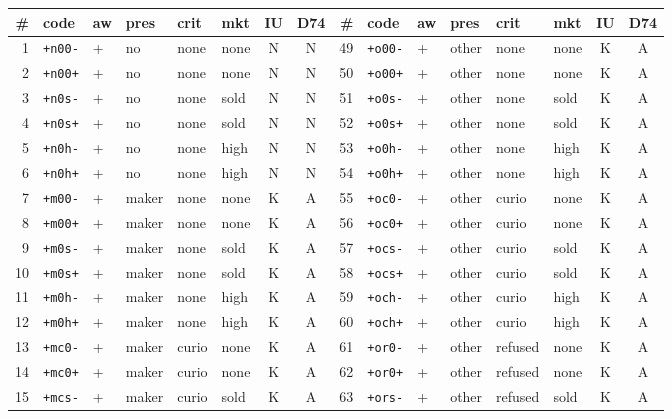 {\scriptsize\setlength{\tabcolsep}{3.5pt}
\begin{longtable}{@{}rlllllcc@{\hspace{2.2em}}rlllllcc@{}}
\# & code & aw & pres & crit & mkt & IU & D74 & \# & code & aw & pres & crit & mkt & IU & D74 \\ \midrule\endhead
1 & \texttt{+n00-} & + & no & none & none & N & N & 49 & \texttt{+o00-} & + & other & none & none & K & A \\
2 & \texttt{+n00+} & + & no & none & none & N & N & 50 & \texttt{+o00+} & + & other & none & none & K & A \\
3 & \texttt{+n0s-} & + & no & none & sold & N & N & 51 & \texttt{+o0s-} & + & other & none & sold & K & A \\
4 & \texttt{+n0s+} & + & no & none & sold & N & N & 52 & \texttt{+o0s+} & + & other & none & sold & K & A \\
5 & \texttt{+n0h-} & + & no & none & high & N & N & 53 & \texttt{+o0h-} & + & other & none & high & K & A \\
6 & \texttt{+n0h+} & + & no & none & high & N & N & 54 & \texttt{+o0h+} & + & other & none & high & K & A \\
7 & \texttt{+m00-} & + & maker & none & none & K & A & 55 & \texttt{+oc0-} & + & other & curio & none & K & A \\
8 & \texttt{+m00+} & + & maker & none & none & K & A & 56 & \texttt{+oc0+} & + & other & curio & none & K & A \\
9 & \texttt{+m0s-} & + & maker & none & sold & K & A & 57 & \texttt{+ocs-} & + & other & curio & sold & K & A \\
10 & \texttt{+m0s+} & + & maker & none & sold & K & A & 58 & \texttt{+ocs+} & + & other & curio & sold & K & A \\
11 & \texttt{+m0h-} & + & maker & none & high & K & A & 59 & \texttt{+och-} & + & other & curio & high & K & A \\
12 & \texttt{+m0h+} & + & maker & none & high & K & A & 60 & \texttt{+och+} & + & other & curio & high & K & A \\
13 & \texttt{+mc0-} & + & maker & curio & none & K & A & 61 & \texttt{+or0-} & + & other & refused & none & K & A \\
14 & \texttt{+mc0+} & + & maker & curio & none & K & A & 62 & \texttt{+or0+} & + & other & refused & none & K & A \\
15 & \texttt{+mcs-} & + & maker & curio & sold & K & A & 63 & \texttt{+ors-} & + & other & refused & sold & K & A \\

\end{longtable}}
